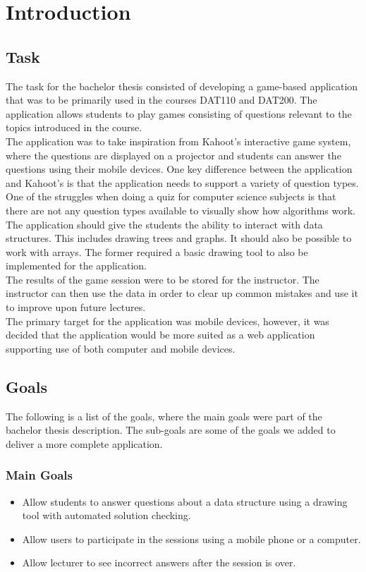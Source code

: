 \section{Introduction}
\subsection{Task}
The task for the bachelor thesis consisted of developing a game-based application that was to be primarily used in the courses DAT110 and DAT200. The application allows students to play games consisting of questions relevant to the topics introduced in the course.
\\[11pt]
The application was to take inspiration from Kahoot's interactive game system\cite{Kahoot}, where the questions are displayed on a projector and students can answer the questions using their mobile devices. One key difference between the application and Kahoot's is that the application needs to support a variety of question types. One of the struggles when doing a quiz for computer science subjects is that there are not any question types available to visually show how algorithms work. The application should give the students the ability to interact with data structures. This includes drawing trees and graphs. It should also be possible to work with arrays. The former required a basic drawing tool to also be implemented for the application.
\\[11pt] 
The results of the game session were to be stored for the instructor. The instructor can then use the data in order to clear up common mistakes and use it to improve upon future lectures.
\\[11pt]
The primary target for the application was mobile devices, however, it was decided that the application would be more suited as a web application supporting use of both computer and mobile devices. 

\subsection{Goals}
The following is a list of the goals, where the main goals were part of the bachelor thesis description. The sub-goals are some of the goals we added to deliver a more complete application.
\subsubsection{Main Goals}
\begin{itemize}
\item Allow students to answer questions about a data structure using a drawing tool with automated solution checking.
\item Allow users to participate in the sessions using a mobile phone or a computer.
\item Allow lecturer to see incorrect answers after the session is over.
\end{itemize}
